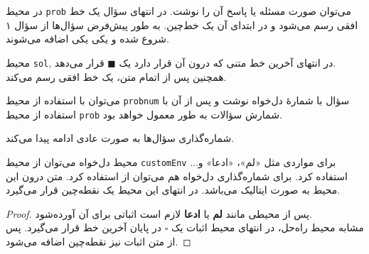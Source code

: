 \begin{prob}
	در محیط
	\texttt{prob}
	می‌توان صورت مسئله یا پاسخ آن را نوشت.  در انتهای سؤال یک خط افقی رسم می‌شود و در ابتدای آن یک خط‌چین. به طور پیش‌فرض سؤال‌ها از سؤال ۱ شروع شده و یکی یکی اضافه می‌شوند.
	
\end{prob}
\begin{sol}
	محیط
	\texttt{sol},
	در انتهای آخرین خط متنی که درون آن قرار دارد یک 
	$ \blacksquare $
	قرار می‌دهد.\\	
	همچنین پس از اتمام متن، یک خط افقی رسم می‌کند.
\end{sol}
\begin{probnum}{10}
می‌توان با استفاده از محیط
\texttt{probnum}
 سؤال با شمارهٔ دل‌خواه نوشت و پس از آن با استفاده از محیط 
 \texttt{prob}
 شمارش سؤالات به طور معمول خواهد بود.
\end{probnum}

\begin{prob}
	شماره‌گذاری سؤال‌ها به صورت عادی ادامه پیدا می‌کند.
	
\end{prob}
\begin{customEnv}{محیط دل‌خواه}
	می‌توان از محیط
	\texttt{customEnv}
	برای مواردی مثل «لم»، «ادعا» و... استفاده کرد. برای شماره‌گذاری دل‌خواه هم می‌توان از
استفاده کرد. متن درون این محیط به صورت ایتالیک می‌باشد. در انتهای این محیط یک نقطه‌چین قرار می‌گیرد.
\end{customEnv}
\begin{proof}
پس از محیطی مانند
\textbf{لم}
یا
\textbf{ادعا}
لازم است اثباتی برای آن آورده‌شود.\\
مشابه محیط راه‌حل، در انتهای محیط اثبات یک 
$\square$
در پایان آخرین خط قرار می‌گیرد. پس از متن اثبات نیز نقطه‌چین اضافه می‌شود.
\end{proof}